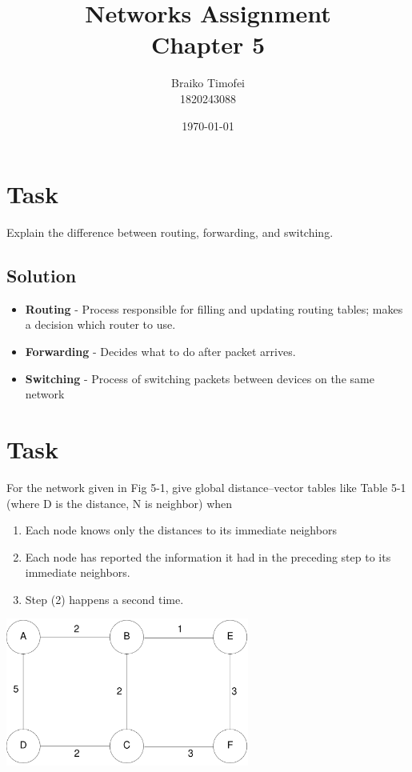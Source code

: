 \documentclass[11pt]{article}
\title{Networks Assignment\\ Chapter 5}
\author{Braiko Timofei\\1820243088}
\date{\today}
\begin{document}
    \section{Task}\label{sec:task-1}
    Explain the difference between routing, forwarding, and switching.

    \subsection{Solution}
    \begin{itemize}
        \item \textbf{Routing} - Process responsible for filling and updating routing tables;
        makes a decision which router to use.
        \item \textbf{Forwarding} - Decides what to do after packet arrives.
        \item \textbf{Switching} - Process of switching packets between devices on the same network
    \end{itemize}
    \newpage


    \section{Task}\label{sec:task-2}
    For the network given in Fig 5-1, give global distance–vector tables like Table 5-1 (where D is the
    distance, N is neighbor) when
    \begin{enumerate}
        \item Each node knows only the distances to its immediate neighbors
        \item Each node has reported the information it had in the preceding step to its immediate neighbors.
        \item Step (2) happens a second time.
    \end{enumerate}

    \begin{center}
        \includegraphics[width=0.6\textwidth]{figs/graph}
    \end{center}
\end{document}
